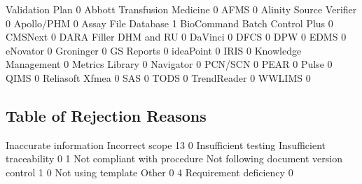 \documentclass{article}
\begin{document}
\begin{Schunk}
\begin{Soutput}
                                Validation Plan
                                              0
  Abbott Transfusion Medicine                 0
  AFMS                                        0
  Alinity Source Verifier                     0
  Apollo/PHM                                  0
  Assay File Database                         1
  BioCommand Batch Control Plus               0
  CMSNext                                     0
  DARA Filler DHM and RU                      0
  DaVinci                                     0
  DFCS                                        0
  DPW                                         0
  EDMS                                        0
  eNovator                                    0
  Groninger                                   0
  GS Reports                                  0
  ideaPoint                                   0
  IRIS                                        0
  Knowledge Management                        0
  Metrics Library                             0
  Navigator                                   0
  PCN/SCN                                     0
  PEAR                                        0
  Pulse                                       0
  QIMS                                        0
  Reliasoft Xfmea                             0
  SAS                                         0
  TODS                                        0
  TrendReader                                 0
  WWLIMS                                      0
\end{Soutput}
\end{Schunk}

\subsection{Table of Rejection Reasons}
\begin{Schunk}
\begin{Soutput}
                Inaccurate information                        Incorrect scope 
                                    13                                      0 
                  Insufficient testing              Insufficient traceability 
                                     0                                      1 
          Not compliant with procedure Not following document version control 
                                     1                                      0 
                    Not using template                                  Other 
                                     0                                      4 
                Requirement deficiency 
                                     0 
\end{Soutput}
\end{Schunk}
\end{document}
